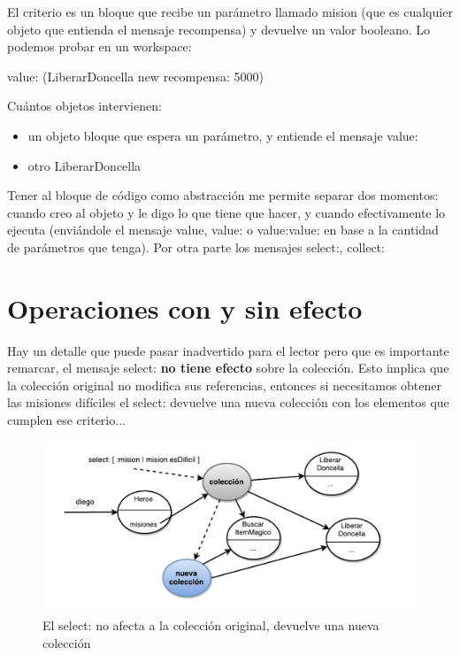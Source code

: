 \documentclass[a4paper,12pt]{book}
\begin{document}
El criterio es un bloque que recibe un parámetro llamado mision (que es cualquier objeto que entienda el mensaje
recompensa) y devuelve un valor booleano. Lo podemos probar en un workspace:

\begin{code}
 value: (LiberarDoncella new recompensa: 5000)
\end{code}

Cuántos objetos intervienen:

\begin{itemize}
 \item un objeto bloque que espera un parámetro, y entiende el mensaje value:
 \item otro LiberarDoncella
\end{itemize}

Tener al bloque de código como abstracción me permite separar dos momentos: cuando creo al objeto y le digo lo
que tiene que hacer, y cuando efectivamente lo ejecuta (enviándole el mensaje value, value: o value:value: en
base a la cantidad de parámetros que tenga). Por otra parte los mensajes select:, collect: 

\section{Operaciones con y sin efecto}

Hay un detalle que puede pasar inadvertido para el lector pero que es importante remarcar, el mensaje select:
\textbf{no tiene efecto} sobre la colección. Esto implica que la colección original no modifica sus referencias,
entonces si necesitamos obtener las misiones difíciles el select: devuelve una nueva colección con los elementos
que cumplen ese criterio...

\begin{figure}[h!]
    \centering
    \includegraphics[width=1.1\textwidth]{images/20_select_sin_efecto.pdf}
    \caption{El select: no afecta a la colección original, devuelve una nueva colección}
\end{figure}
\end{document}
